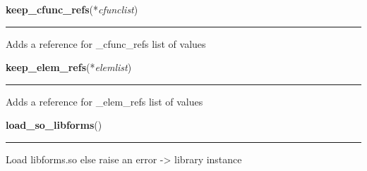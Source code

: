     \label{xformslib:library:keep_cfunc_refs}

    \vspace{0.5ex}

\hspace{.8\funcindent}\begin{boxedminipage}{\funcwidth}

    \raggedright \textbf{keep\_cfunc\_refs}(*\textit{cfunclist})

    \vspace{-1.5ex}

    \rule{\textwidth}{0.5\fboxrule}
\setlength{\parskip}{2ex}
    Adds a reference for \_cfunc\_refs list of values

\setlength{\parskip}{1ex}
    \end{boxedminipage}

    \label{xformslib:library:keep_elem_refs}

    \vspace{0.5ex}

\hspace{.8\funcindent}\begin{boxedminipage}{\funcwidth}

    \raggedright \textbf{keep\_elem\_refs}(*\textit{elemlist})

    \vspace{-1.5ex}

    \rule{\textwidth}{0.5\fboxrule}
\setlength{\parskip}{2ex}
    Adds a reference for \_elem\_refs list of values

\setlength{\parskip}{1ex}
    \end{boxedminipage}

    \label{xformslib:library:load_so_libforms}

    \vspace{0.5ex}

\hspace{.8\funcindent}\begin{boxedminipage}{\funcwidth}

    \raggedright \textbf{load\_so\_libforms}()

    \vspace{-1.5ex}

    \rule{\textwidth}{0.5\fboxrule}
\setlength{\parskip}{2ex}
    Load libforms.so else raise an error -{\textgreater} library instance

\setlength{\parskip}{1ex}
    \end{boxedminipage}

